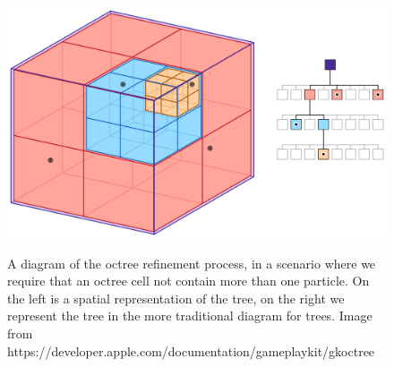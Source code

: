 \begin{figure}[H]
    \centering
    \includegraphics[width=\textwidth,height=\textheight,keepaspectratio]{figures/apple_octree.png}
    \label{fig:octree_refinement}
    \caption {
        A diagram of the octree refinement process, in a scenario where we require that an octree cell not contain more than one particle.
        On the left is a spatial representation of the tree, on the right we represent the tree in the more traditional diagram for trees.
        Image from https://developer.apple.com/documentation/gameplaykit/gkoctree
    }
\end{figure}


